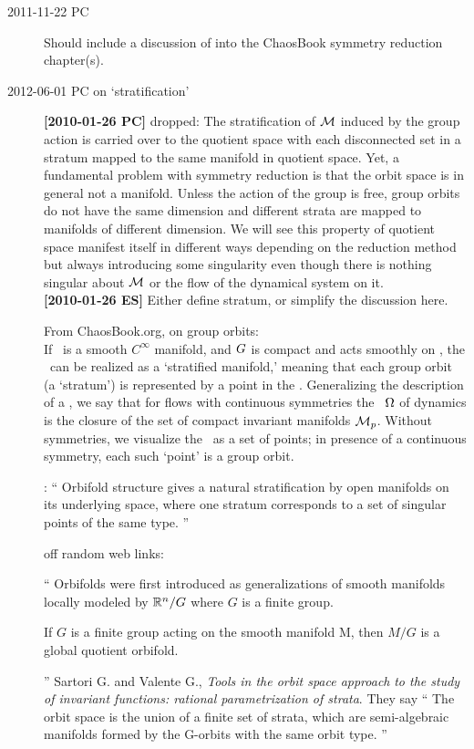 \begin{description}
\item[2011-11-22 PC]                                \toCB
Should include a discussion of
into the ChaosBook symmetry reduction chapter(s).


\item[2012-06-01 PC on `stratification']

{\bf [2010-01-26 PC]} dropped:
The stratification of ${\cal M}$ induced by the group action is carried over
to the quotient space with each disconnected set in a stratum mapped to
the same manifold in quotient space. Yet, a fundamental problem with
symmetry reduction is that the orbit space is in general not a manifold.
Unless the action of the group is free, group orbits do not have the same
dimension and different strata are mapped to manifolds of different
dimension. We will see this property of quotient space manifest itself in
different ways depending on the reduction method but always introducing
some singularity even though there is nothing singular about ${\cal M}$ or the
flow of the dynamical system on it.
\\
{\bf [2010-01-26 ES]} Either define stratum, or simplify the discussion 		
here.

From ChaosBook.org, on group orbits:
\\
If \pS\ is a
smooth $C^\infty$ manifold, and $G$ is compact and acts
smoothly on \pS, the \reducedsp\ can be realized
as a `stratified manifold,' meaning that each group orbit (a
`stratum') is represented by a point in the \reducedsp.
Generalizing the description
of a \nws,
we say that for flows
with continuous symmetries the \nws\ $\Omega$ of  dynamics
is the closure of the set of compact
invariant manifolds ${\cal M}_p$. Without symmetries, we visualize
the \nws\ as a set of points; in presence of a continuous symmetry,
each such `point' is a group orbit.

:
``
Orbifold structure gives a natural stratification by open manifolds on
its underlying space, where one stratum corresponds to a set of singular
points of the same type.
''

off random web links:

``
Orbifolds were first introduced as generalizations of smooth manifolds
locally modeled by $\mathbb{R}^n/G$ where $G$ is a finite group.

If $G$ is a finite group acting on the smooth manifold M, then $M/G$ is a
global quotient orbifold.

''
Sartori G. and Valente G.,
{\emph{Tools in the orbit space approach}}
\emph{to the study of invariant functions: rational parametrization of strata}.
They say ``
The orbit space is the union of a finite set of strata, which are
semi-algebraic manifolds formed by the G-orbits with the same orbit type.
''


\end{description}


